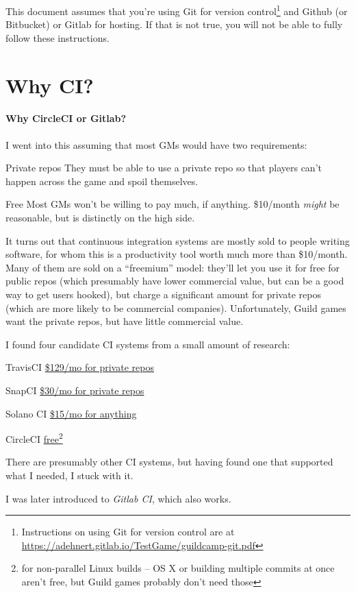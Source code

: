 \documentclass[green]{testgame}
\begin{document}
\newcommand{\ter}[1]{\fbox{\parbox{6.5in}{{\tt #1}}}}
\newcommand{\GameTeX}{GameTeX}
\newcommand{\webbase}{https://adehnert.gitlab.io/TestGame}


This document assumes that you're using Git for version control\footnote{Instructions on using Git for version control are at \url{\webbase/guildcamp-git.pdf}} and Github (or Bitbucket) or Gitlab for hosting. If that is not true, you will not be able to fully follow these instructions.

\section{Why CI?}

\begin{WrapText}
  \paragraph*{Why CircleCI or Gitlab?} I went into this assuming that most GMs would have two requirements:
  \begin{desc}
  \item[Private repos] They must be able to use a private repo so that players can't happen across the game and spoil themselves.
  \item[Free] Most GMs won't be willing to pay much, if anything. \$10/month \emph{might} be reasonable, but is distinctly on the high side.
  \end{desc}

  It turns out that continuous integration systems are mostly sold to people writing software, for whom this is a productivity tool worth much more than \$10/month. Many of them are sold on a ``freemium'' model: they'll let you use it for free for public repos (which presumably have lower commercial value, but can be a good way to get users hooked), but charge a significant amount for private repos (which are more likely to be commercial companies). Unfortunately, Guild games want the private repos, but have little commercial value.

  I found four candidate CI systems from a small amount of research:
  \begin{desc}
  \item[TravisCI] \href{https://travis-ci.com/plans}{\$129/mo for private repos}
  \item[SnapCI] \href{https://snap-ci.com/my_plans/}{\$30/mo for private repos}
  \item[Solano CI] \href{https://www.solanolabs.com/#pricing}{\$15/mo for anything}
  \item[CircleCI] \href{https://circleci.com/pricing/}{free\footnote{for non-parallel Linux builds -- OS X or building multiple commits at once aren't free, but Guild games probably don't need those}}
  \end{desc}

  There are presumably other CI systems, but having found one that supported what I needed, I stuck with it.

  I was later introduced to \emph{Gitlab CI}, which also works.
\end{WrapText}
\end{document}
